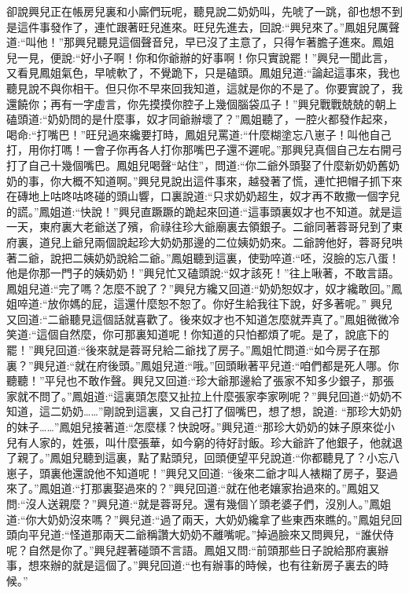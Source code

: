 \begin{parag}
    卻說興兒正在帳房兒裏和小廝們玩呢，聽見說二奶奶叫，先唬了一跳，卻也想不到是這件事發作了，連忙跟著旺兒進來。旺兒先進去，回說:“興兒來了。”鳳姐兒厲聲道:“叫他！”那興兒聽見這個聲音兒，早已沒了主意了，只得乍著膽子進來。鳳姐兒一見，便說:“好小子啊！你和你爺辦的好事啊！你只實說罷！”興兒一聞此言，又看見鳳姐氣色，早唬軟了，不覺跪下，只是磕頭。鳳姐兒道:“論起這事來，我也聽見說不與你相干。但只你不早來回我知道，這就是你的不是了。你要實說了，我還饒你；再有一字虛言，你先摸摸你腔子上幾個腦袋瓜子！”興兒戰戰兢兢的朝上磕頭道:“奶奶問的是什麼事，奴才同爺辦壞了？”鳳姐聽了，一腔火都發作起來，喝命:“打嘴巴！”旺兒過來纔要打時，鳳姐兒罵道:“什麼糊塗忘八崽子！叫他自己打，用你打嗎！一會子你再各人打你那嘴巴子還不遲呢。”那興兒真個自己左右開弓打了自己十幾個嘴巴。鳳姐兒喝聲“站住”，問道:“你二爺外頭娶了什麼新奶奶舊奶奶的事，你大概不知道啊。”興兒見說出這件事來，越發著了慌，連忙把帽子抓下來在磚地上咕咚咕咚碰的頭山響，口裏說道:“只求奶奶超生，奴才再不敢撒一個字兒的謊。”鳳姐道:“快說！”興兒直蹶蹶的跪起來回道:“這事頭裏奴才也不知道。就是這一天，東府裏大老爺送了殯，俞祿往珍大爺廟裏去領銀子。二爺同著蓉哥兒到了東府裏，道兒上爺兒兩個說起珍大奶奶那邊的二位姨奶奶來。二爺誇他好，蓉哥兒哄著二爺，說把二姨奶奶說給二爺。”鳳姐聽到這裏，使勁啐道:“呸，沒臉的忘八蛋！他是你那一門子的姨奶奶！”興兒忙又磕頭說:“奴才該死！”往上啾著，不敢言語。鳳姐兒道:“完了嗎？怎麼不說了？”興兒方纔又回道:“奶奶恕奴才，奴才纔敢回。”鳳姐啐道:“放你媽的屁，這還什麼恕不恕了。你好生給我往下說，好多著呢。” 興兒又回道:“二爺聽見這個話就喜歡了。後來奴才也不知道怎麼就弄真了。”鳳姐微微冷笑道:“這個自然麼，你可那裏知道呢！你知道的只怕都煩了呢。是了，說底下的罷！”興兒回道:“後來就是蓉哥兒給二爺找了房子。”鳳姐忙問道:“如今房子在那裏？”興兒道:“就在府後頭。”鳳姐兒道:“哦。”回頭瞅著平兒道:“咱們都是死人哪。你聽聽！”平兒也不敢作聲。興兒又回道:“珍大爺那邊給了張家不知多少銀子，那張家就不問了。”鳳姐道:“這裏頭怎麼又扯拉上什麼張家李家咧呢？”興兒回道:“奶奶不知道，這二奶奶……”剛說到這裏，又自己打了個嘴巴，想了想，說道: “那珍大奶奶的妹子……”鳳姐兒接著道:“怎麼樣？快說呀。”興兒道:“那珍大奶奶的妹子原來從小兒有人家的，姓張，叫什麼張華，如今窮的待好討飯。珍大爺許了他銀子，他就退了親了。”鳳姐兒聽到這裏，點了點頭兒，回頭便望平兒說道:“你都聽見了？小忘八崽子，頭裏他還說他不知道呢！”興兒又回道: “後來二爺才叫人裱糊了房子，娶過來了。”鳳姐道:“打那裏娶過來的？”興兒回道:“就在他老孃家抬過來的。”鳳姐又問:“沒人送親麼？”興兒道:“就是蓉哥兒。還有幾個丫頭老婆子們，沒別人。”鳳姐道:“你大奶奶沒來嗎？”興兒道:“過了兩天，大奶奶纔拿了些東西來瞧的。”鳳姐兒回頭向平兒道:“怪道那兩天二爺稱讚大奶奶不離嘴呢。”掉過臉來又問興兒，“誰伏侍呢？自然是你了。”興兒趕著碰頭不言語。鳳姐又問:“前頭那些日子說給那府裏辦事，想來辦的就是這個了。”興兒回道:“也有辦事的時候，也有往新房子裏去的時候。”
\end{parag}


